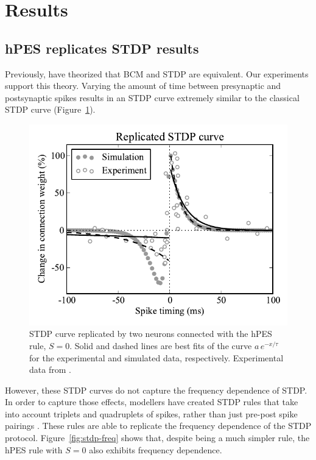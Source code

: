 \documentclass[10pt,letterpaper]{article}
\begin{document}
\section{Results}

\subsection{hPES replicates STDP results}

Previously, 
have theorized that BCM and STDP are equivalent.
Our experiments support this theory.
Varying the amount of time between presynaptic
and postsynaptic spikes results in an STDP curve
extremely similar to the classical
 STDP curve
(Figure~\ref{fig:stdp-curve}).

\begin{figure}[ht]
\begin{center}
\includegraphics[width=\columnwidth]{fig1-bcm-stdp}
\end{center}
\caption{STDP curve replicated by two neurons
  connected with the hPES rule, $S = 0$.
  Solid and dashed lines are best fits of the curve
  $a\,e^{-x / \tau}$ for the experimental
  and simulated data, respectively.
  Experimental data from .}
\label{fig:stdp-curve}
\end{figure}

However, these STDP curves do not capture
the frequency dependence of STDP.
In order to capture those effects,
modellers have created STDP rules that take into
account triplets and quadruplets of spikes,
rather than just pre-post spike pairings \cite{Pfister2006}.
These rules are able to replicate
the frequency dependence of the STDP protocol.
Figure~\ref{fig:stdp-freq} shows that,
despite being a much simpler rule,
the hPES rule with $S = 0$
also exhibits frequency dependence.
\end{document}
